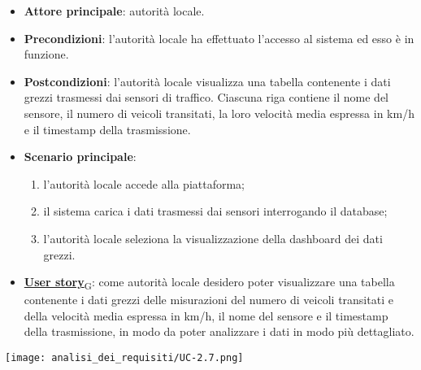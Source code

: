 \begin{itemize}
	\item \textbf{Attore principale}: autorità locale.
	\item \textbf{Precondizioni}: l'autorità locale ha effettuato l'accesso al sistema ed esso è in funzione.
	\item \textbf{Postcondizioni}: l'autorità locale visualizza una tabella contenente i dati grezzi trasmessi dai sensori di traffico.
	      Ciascuna riga contiene il nome del sensore, il numero di veicoli transitati, la loro velocità media espressa in km/h e il timestamp della trasmissione.
	\item \textbf{Scenario principale}:
	      \begin{enumerate}
		      \item l'autorità locale accede alla piattaforma;
		      \item il sistema carica i dati trasmessi dai sensori interrogando il database;
		      \item l'autorità locale seleziona la visualizzazione della dashboard dei dati grezzi.
	      \end{enumerate}
	\item \href{https://7last.github.io/docs/pb/documentazione-interna/glossario\#user-story}{\textbf{User story}\textsubscript{G}}:
	      come autorità locale desidero poter visualizzare una tabella contenente i dati grezzi delle misurazioni del numero di veicoli transitati
	      e della velocità media espressa in km/h, il nome del sensore e il timestamp della trasmissione, in modo da poter analizzare i dati in modo più dettagliato.
\end{itemize}
\begin{center}
	\texttt{[image: analisi\_dei\_requisiti/UC-2.7.png]}
\end{center}

